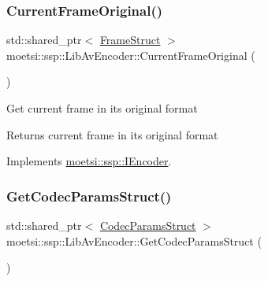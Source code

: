 \mbox{\label{classmoetsi_1_1ssp_1_1LibAvEncoder_a249c65ad557f438d6856e875f01a1947}} 
\subsubsection{\texorpdfstring{Current\+Frame\+Original()}{CurrentFrameOriginal()}}
{\footnotesize\ttfamily std\+::shared\+\_\+ptr$<$ \hyperlink{structmoetsi_1_1ssp_1_1FrameStruct}{Frame\+Struct} $>$ moetsi\+::ssp\+::\+Lib\+Av\+Encoder\+::\+Current\+Frame\+Original (\begin{DoxyParamCaption}{ }\end{DoxyParamCaption})\hspace{0.3cm}{\ttfamily [virtual]}}

Get current frame in its original format \begin{DoxyReturn}{Returns}
current frame in its original format 
\end{DoxyReturn}


Implements \hyperlink{classmoetsi_1_1ssp_1_1IEncoder_ab60bdaae0a85289dfa31a12bab533dc0}{moetsi\+::ssp\+::\+I\+Encoder}.

\mbox{\label{classmoetsi_1_1ssp_1_1LibAvEncoder_a2ff6afafbb5da48e900d34d70a46d00c}} 
\subsubsection{\texorpdfstring{Get\+Codec\+Params\+Struct()}{GetCodecParamsStruct()}}
{\footnotesize\ttfamily std\+::shared\+\_\+ptr$<$ \hyperlink{structmoetsi_1_1ssp_1_1CodecParamsStruct}{Codec\+Params\+Struct} $>$ moetsi\+::ssp\+::\+Lib\+Av\+Encoder\+::\+Get\+Codec\+Params\+Struct (\begin{DoxyParamCaption}{ }\end{DoxyParamCaption})\hspace{0.3cm}{\ttfamily [virtual]}}

